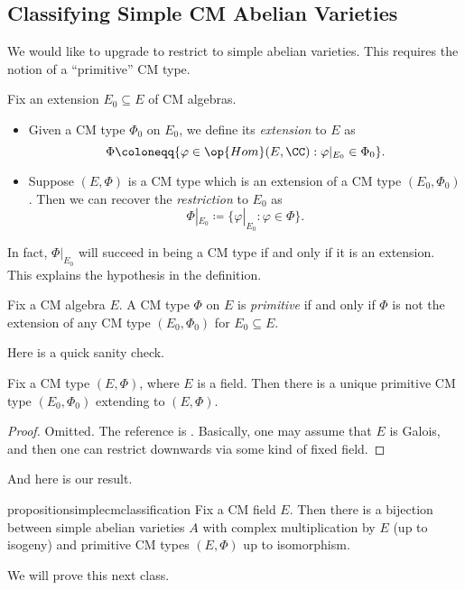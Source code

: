 \documentclass[../notes.tex]{subfiles}
\begin{document}
\subsection{Classifying Simple CM Abelian Varieties}
We would like to upgrade  to restrict to simple abelian varieties. This requires the notion of a ``primitive'' CM type.
\begin{defihelper}  
	Fix an extension $E_0\subseteq E$ of CM algebras.
	\begin{itemize}
		\item Given a CM type $\Phi_0$ on $E_0$, we define its \textit{extension} to $E$ as
		\[\Phi\coloneqq\{\varphi\in\op{Hom}(E,\CC):\varphi|_{E_0}\in\Phi_0\}.\]
		\item Suppose $(E,\Phi)$ is a CM type which is an extension of a CM type $(E_0,\Phi_0)$. Then we can recover the \textit{restriction} to $E_0$ as
		\[\Phi|_{E_0}\coloneqq\{\varphi|_{E_0}:\varphi\in\Phi\}.\]
	\end{itemize}
\end{defihelper}
\begin{remark}
	In fact, $\Phi|_{E_0}$ will succeed in being a CM type if and only if it is an extension. This explains the hypothesis in the definition.
\end{remark}
\begin{definition}[primitive]
	Fix a CM algebra $E$. A CM type $\Phi$ on $E$ is \textit{primitive} if and only if $\Phi$ is not the extension of any CM type $(E_0,\Phi_0)$ for $E_0\subseteq E$.
\end{definition}
Here is a quick sanity check.
\begin{lemma}
	Fix a CM type $(E,\Phi)$, where $E$ is a field. Then there is a unique primitive CM type $(E_0,\Phi_0)$ extending to $(E,\Phi)$.
\end{lemma}
\begin{proof}
	Omitted. The reference is \cite[Proposition~1.9]{milne-cm}. Basically, one may assume that $E$ is Galois, and then one can restrict downwards via some kind of fixed field.
\end{proof}
And here is our result.
\begin{restatable}{proposition}{simplecmclassification}
	Fix a CM field $E$. Then there is a bijection between simple abelian varieties $A$ with complex multiplication by $E$ (up to isogeny) and primitive CM types $(E,\Phi)$ up to isomorphism.
\end{restatable}
We will prove this next class.
\end{document}
